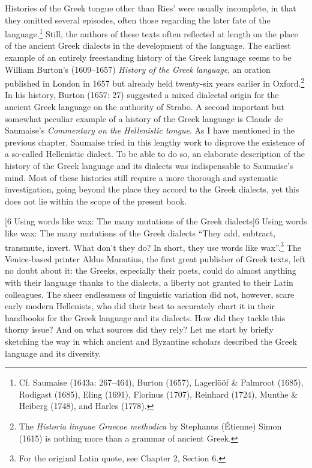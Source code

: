 \documentclass[12pt]{article}
\makeatletter
\renewcommand\section{\@startsection{section}{1}{0.0in}{0.1665in}{0.0835in}{\normalfont\normalsize\fontsize{14pt}{16.8pt}\selectfont\rmfamily\bfseries}}
\newenvironment{styleStandard}{\renewcommand\baselinestretch{1.25}\setlength\leftskip{0in}\setlength\rightskip{0in}\setlength\parindent{0.1972in}\setlength\parfillskip{0pt plus 1fil}\setlength\parskip{0in plus 1pt}\writerlistparindent\writerlistleftskip\leavevmode\normalfont\normalsize\writerlistlabel\ignorespaces}{\unskip\vspace{0in plus 1pt}\par}
\newenvironment{styleCatalogusnotities}{\renewcommand\baselinestretch{1.25}\setlength\leftskip{0in}\setlength\rightskip{0in}\setlength\parindent{0in}\setlength\parfillskip{0pt plus 1fil}\setlength\parskip{0in plus 1pt}\writerlistparindent\writerlistleftskip\leavevmode\normalfont\normalsize\writerlistlabel\ignorespaces}{\unskip\vspace{0in plus 1pt}\par}
\newcommand\writerlistleftskip{}
\newcommand\writerlistparindent{}
\newcommand\writerlistlabel{}
\makeatother
\begin{document}
\begin{styleStandard}
Histories of the Greek tongue other than Ries’ were usually incomplete, in that they omitted several episodes, often those regarding the later fate of the language.\footnote{ Cf. Saumaise (1643a: 267–464), Burton (1657), Lagerlööf \& Palmroot (1685), Rodigast (1685), Eling (1691), Florinus (1707), Reinhard (1724), Munthe \& Heiberg (1748), and Harles (1778).} Still, the authors of these texts often reflected at length on the place of the ancient Greek dialects in the development of the language. The earliest example of an entirely freestanding history of the Greek language seems to be William Burton’s (1609–1657) \textit{History of the Greek language}, an oration published in London in 1657 but already held twenty-six years earlier in Oxford.\footnote{ The \textit{Historia linguae Graecae methodica} by Stephanus (Étienne) Simon (1615) is nothing more than a grammar of ancient Greek.} In his history, Burton (1657: 27) suggested a mixed dialectal origin for the ancient Greek language on the authority of Strabo. A second important but somewhat peculiar example of a history of the Greek language is Claude de Saumaise’s \textit{Commentary on the Hellenistic tongue}. As I have mentioned in the previous chapter, Saumaise tried in this lengthy work to disprove the existence of a so-called Hellenistic dialect. To be able to do so, an elaborate description of the history of the Greek language and its dialects was indispensable to Saumaise’s mind. Most of these histories still require a more thorough and systematic investigation, going beyond the place they accord to the Greek dialects, yet this does not lie within the scope of the present book.
\end{styleStandard}

\clearpage\section[6 Using words like wax: The many mutations of the Greek dialects]{6 Using words like wax: The many mutations of the Greek dialects}
\hypertarget{Toc19704843}{}\begin{styleCatalogusnotities}
“They add, subtract, transmute, invert. What don’t they do? In short, they use words like wax”.\footnote{\textrm{ For the original Latin quote, see Chapter 2, Section 6.}} The Venice-based printer Aldus Manutius, the first great publisher of Greek texts, left no doubt about it: the Greeks, especially their poets, could do almost anything with their language thanks to the dialects, a liberty not granted to their Latin colleagues. The sheer endlessness of linguistic variation did not, however, scare early modern Hellenists, who did their best to accurately chart it in their handbooks for the Greek language and its dialects. How did they tackle this thorny issue? And on what sources did they rely? Let me start by briefly sketching the way in which ancient and Byzantine scholars described the Greek language and its diversity.
\end{styleCatalogusnotities}
\end{document}

